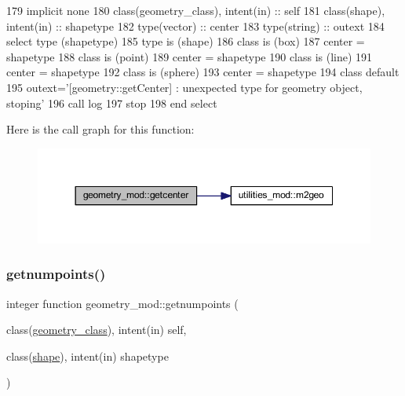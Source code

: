 \begin{DoxyCode}
179     \textcolor{keywordtype}{implicit none}
180     \textcolor{keywordtype}{class}(geometry\_class), \textcolor{keywordtype}{intent(in)} :: self
181     \textcolor{keywordtype}{class}(shape), \textcolor{keywordtype}{intent(in)} :: shapetype
182     \textcolor{keywordtype}{type}(vector) :: center
183     \textcolor{keywordtype}{type}(string) :: outext
184     \textcolor{keywordflow}{select type} (shapetype)
185 \textcolor{keywordflow}{    type is} (shape)
186 \textcolor{keywordflow}{    class is} (box)
187         center = shapetype%
188 \textcolor{keywordflow}{    class is} (point)
189         center = shapetype%
190 \textcolor{keywordflow}{    class is} (line)
191         center = shapetype%
192 \textcolor{keywordflow}{    class is} (sphere)
193         center = shapetype%
194 \textcolor{keywordflow}{        class default}
195         outext=\textcolor{stringliteral}{'[geometry::getCenter] : unexpected type for geometry object, stoping'}
196         \textcolor{keyword}{call }log%
197         stop
198 \textcolor{keywordflow}{    end select}
\end{DoxyCode}
Here is the call graph for this function\+:
\nopagebreak
\begin{figure}[H]
\begin{center}
\leavevmode
\includegraphics[width=350pt]{namespacegeometry__mod_a4a38edbff02aa0ff5f16a16c39bf778e_cgraph}
\end{center}
\end{figure}
\mbox{\label{namespacegeometry__mod_a524c5d28a80fb6729b102126485605ce}} 
\subsubsection{\texorpdfstring{getnumpoints()}{getnumpoints()}}
{\footnotesize\ttfamily integer function geometry\+\_\+mod\+::getnumpoints (\begin{DoxyParamCaption}\item[{class(\mbox{\hyperlink{structgeometry__mod_1_1geometry__class}{geometry\+\_\+class}}), intent(in)}]{self,  }\item[{class(\mbox{\hyperlink{structgeometry__mod_1_1shape}{shape}}), intent(in)}]{shapetype }\end{DoxyParamCaption})\hspace{0.3cm}{\ttfamily [private]}}




